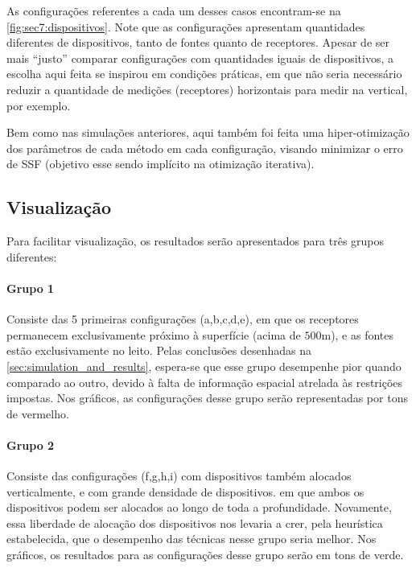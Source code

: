 As configurações referentes a cada um desses casos encontram-se na \cref{fig:sec7:dispositivos}. Note que as configurações apresentam quantidades diferentes de dispositivos, tanto de fontes quanto de receptores. Apesar de ser mais ``justo'' comparar configurações com quantidades iguais de dispositivos, a escolha aqui feita se inspirou em condições práticas, em que não seria necessário reduzir a quantidade de medições (receptores) horizontais para medir na vertical, por exemplo.

Bem como nas simulações anteriores, aqui também foi feita uma hiper-otimização dos parâmetros de cada método em cada configuração, visando minimizar o erro de SSF (objetivo esse sendo implícito na otimização iterativa).



\subsection{Visualização}

Para facilitar visualização, os resultados serão apresentados para três grupos diferentes:

\paragraph{Grupo 1}

Consiste das 5 primeiras configurações (a,b,c,d,e), em que os receptores permanecem exclusivamente próximo à superfície (acima de $500\si{\meter}$), e as fontes estão exclusivamente no leito. Pelas conclusões desenhadas na \cref{sec:simulation_and_results}, espera-se que esse grupo desempenhe pior quando comparado ao outro, devido à falta de informação espacial atrelada às restrições impostas. Nos gráficos, as configurações desse grupo serão representadas por tons de vermelho.

\paragraph{Grupo 2}

Consiste das configurações (f,g,h,i) com dispositivos também alocados verticalmente, e com grande densidade de dispositivos. em que ambos os dispositivos podem ser alocados ao longo de toda a profundidade. Novamente, essa liberdade de alocação dos dispositivos nos levaria a crer, pela heurística estabelecida, que o desempenho das técnicas nesse grupo seria melhor. Nos gráficos, os resultados para as configurações desse grupo serão em tons de verde.

